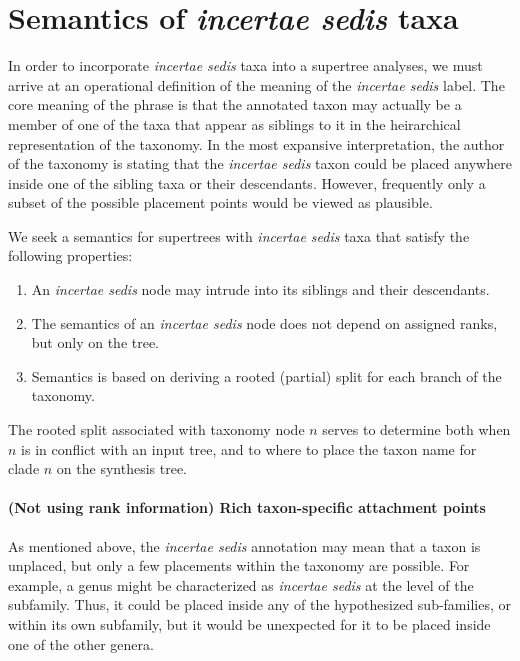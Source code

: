 \documentclass[english]{article}
\begin{document}
\section{\label{sec:Semantics-of-incertae}Semantics of \emph{incertae
sedis} taxa}

In order to incorporate \emph{incertae sedis }taxa into a supertree
analyses, we must arrive at an operational definition of the meaning
of the \emph{incertae sedis} label.
The core meaning of the phrase is
that the annotated taxon may actually be a member of one of the taxa
that appear as siblings to it in the heirarchical representation of
the taxonomy.
In the most expansive interpretation, the author of the
taxonomy is stating that the \emph{incertae sedis} taxon could be
placed anywhere inside one of the sibling taxa or their descendants.
However, frequently only a subset of the possible placement points
would be viewed as plausible.

We seek a semantics for supertrees with \emph{incertae sedis }taxa
that satisfy the following properties:
\begin{enumerate}
    \item An \emph{incertae sedis} node may intrude into its siblings and their
descendants.
    \item The semantics of an \emph{incertae sedis} node does not depend on assigned ranks, but only on the tree.
    \item Semantics is based on deriving a rooted (partial) split for each branch of the taxonomy.
\end{enumerate}

The rooted split associated with taxonomy node $n$ serves to determine both when $n$ is in conflict
with an input tree, and to where to place the taxon name for clade $n$ on the synthesis tree.

\paragraph{(Not using rank information) Rich taxon-specific attachment points}
As mentioned above, the \emph{incertae sedis} annotation may mean that a taxon is
unplaced, but only a few placements within the taxonomy are possible.
For example, a genus might be characterized as \emph{incertae sedis}
at the level of the subfamily.
Thus, it could be placed inside any of the
hypothesized sub-families, or within its own subfamily, but it would
be unexpected for it to be placed inside one of the other genera.
\end{document}
